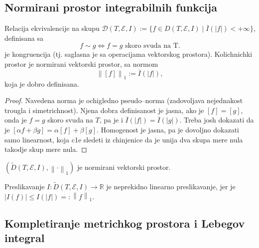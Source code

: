 \documentclass[a4paper,12pt]{article}
\newcommand{\RR}{\mathbb{R}}
\newcommand{\norm}[1]{\left\lVert#1\right\rVert}
\begin{document}
\subsection{Normirani prostor integrabilnih funkcija}

\begin{lema}
	Relacija ekvivalencije na skupu 
	$\mathcal D (T,\mathcal{E}, I) := \{f \in D(T,\mathcal E, I) \mid \overline{I}(|f|)< +\infty\}$,
	definisana sa 
	\[ f \sim g \iff f = g \text{ skoro svuda na T} .\] 
	je kongruencija (tj. saglasna je sa operacijama vektorskog prostora). Kolichnichki prostor je 
	normirani vektorski prostor, sa normom
	\[ \norm{[f]}_1 := \overline{I}(|f|) ,\] 
	koja je dobro definisana.
\end{lema}
\begin{proof}
	Navedena norma je ochigledno pseudo--norma (zadovoljava nejednakost trougla i simetrichnost). Njena dobra definisanost 
	je jasna, ako je $[f] = [g]$, onda je $f = g$ skoro svuda na $T$, pa je i $\overline{I}(|f|) = \overline{I}(|g|)$.
	Treba josh dokazati da je $[\alpha f + \beta g] = \alpha [f] + \beta [g]$. Homogenost je jasna, pa je dovoljno dokazati
	samo linearnost, koja c1e sledeti iz chinjenice da je unija dva skupa mere nula takodje skup mere nula.
\end{proof}
\begin{posl}
	$(\widetilde{D} (T,\mathcal{E}, I), \norm{\cdot}_1)$ je normirani vektorski prostor.
\end{posl}

\begin{nap}
	Preslikavanje $I:\widetilde{D} (T,\mathcal{E}, I) \to \RR$ je neprekidno linearno preslikavanje,
	jer je $|I(f)| \leq I(|f|) =:\norm{f}_1$.
\end{nap}

\subsection{Kompletiranje metrichkog prostora i Lebegov integral}
\end{document}
